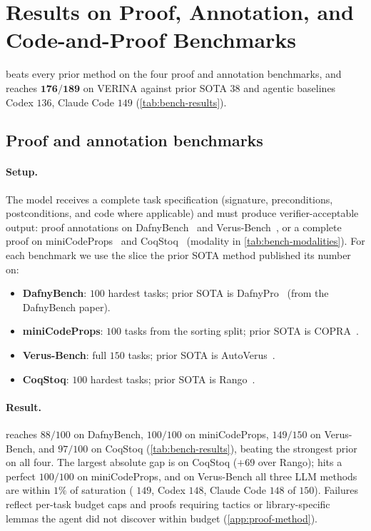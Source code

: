\section{Results on Proof, Annotation, and Code-and-Proof Benchmarks}
\label{app:benchmarks}

\sys{} beats every prior method on the four proof and annotation benchmarks, and reaches $\mathbf{176/189}$ on VERINA against prior SOTA $38$ and agentic baselines Codex $136$, Claude Code $149$ (\cref{tab:bench-results}).




\subsection{Proof and annotation benchmarks}

\paragraph{Setup.}
The model receives a complete task specification (signature, preconditions, postconditions, and code where applicable) and must produce verifier-acceptable output: proof annotations on DafnyBench~\cite{dafnybench} and Verus-Bench~\cite{autoverus}, or a complete proof on miniCodeProps~\cite{minicodeprops} and CoqStoq~\cite{rango} (modality in \cref{tab:bench-modalities}). For each benchmark we use the slice the prior SOTA method published its number on:
\begin{itemize}
\item \textbf{DafnyBench}: $100$ hardest tasks; prior SOTA is DafnyPro~\cite{dafnypro} (from the DafnyBench paper).
\item \textbf{miniCodeProps}: $100$ tasks from the sorting split; prior SOTA is COPRA~\cite{copra}.
\item \textbf{Verus-Bench}: full $150$ tasks; prior SOTA is AutoVerus~\cite{autoverus}.
\item \textbf{CoqStoq}: $100$ hardest tasks; prior SOTA is Rango~\cite{rango}.
\end{itemize}

\paragraph{Result.}
\sys{} reaches $88/100$ on DafnyBench, $100/100$ on miniCodeProps, $149/150$ on Verus-Bench, and $97/100$ on CoqStoq (\cref{tab:bench-results}), beating the strongest prior on all four. The largest absolute gap is on CoqStoq ($+69$ over Rango); \sys{} hits a perfect $100/100$ on miniCodeProps, and on Verus-Bench all three LLM methods are within $1\%$ of saturation (\sys{} $149$, Codex $148$, Claude Code $148$ of $150$). Failures reflect per-task budget caps and proofs requiring tactics or library-specific lemmas the agent did not discover within budget (\cref{app:proof-method}).

